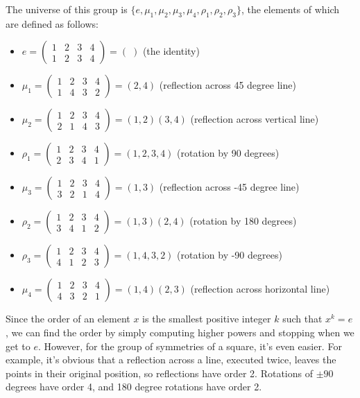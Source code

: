 \documentclass[12pt,reqno]{amsart}
\newcommand{\<}{\ensuremath{\langle}}
\renewcommand{\>}{\ensuremath{\rangle}}
\begin{document}
\begin{enumerate}
The universe of this group is 
$\{e, \mu_1, \mu_2, \mu_3, \mu_4, \rho_1, \rho_2, \rho_3\}$, 
the elements of which are defined as follows:
\begin{itemize}
\item 
$e = \begin{pmatrix} 1 & 2 & 3 & 4\\ 1 & 2 & 3 & 4 \end{pmatrix} = (\;)$
(the identity)
\smallskip
\item 
$\mu_1 = \begin{pmatrix}1 & 2 & 3 &4\\1 & 4 & 3 &2\end{pmatrix} = (2,4)$
(reflection across 45 degree line)
\smallskip
\item 
$\mu_2 = \begin{pmatrix}1 & 2 & 3 &4\\2 & 1 & 4 &3\end{pmatrix} =(1,2)(3,4)$
(reflection across vertical line)
\smallskip
\item
$\rho_1 = \begin{pmatrix}1 & 2 & 3 &4\\2 & 3 & 4 &1\end{pmatrix} = (1,2,3,4)$
(rotation by 90 degrees)
\smallskip
\item 
$\mu_3 = \begin{pmatrix}1 & 2 & 3 &4\\3 & 2 & 1 &4\end{pmatrix} = (1,3)$
(reflection across -45 degree line)
\smallskip
\item 
$\rho_2 = \begin{pmatrix}1 & 2 & 3 &4\\3 & 4 & 1 &2\end{pmatrix} = (1,3)(2,4)$
(rotation by 180 degrees)
\smallskip
\item 
$\rho_3 = \begin{pmatrix}1 & 2 & 3 &4\\4 & 1 & 2 &3\end{pmatrix} =(1,4,3,2)$
(rotation by -90 degrees)
\smallskip
\item 
$\mu_4 = \begin{pmatrix}1 & 2 & 3 &4\\4 & 3 & 2 &1\end{pmatrix} = (1,4)(2,3)$
(reflection across horizontal line)
\end{itemize}
\medskip
Since the order of an element $x$ is the smallest positive integer $k$ such that
$x^k = e$, we can find the order by simply computing higher powers and stopping
when we get to $e$.  However, for the group of symmetries of a square, it's even
easier.  For example, it's obvious that a reflection across a line, executed
twice, leaves the points in their original position, so reflections have order
2.  Rotations of $\pm 90$ degrees have order 4, and 180 degree rotations have
order 2. 


\end{enumerate}
\end{document}
